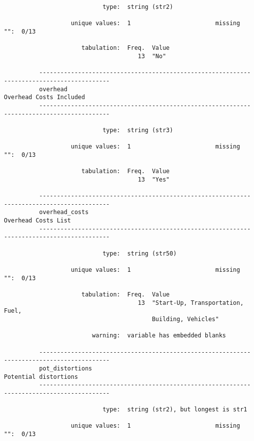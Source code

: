 \documentclass{article}
\begin{document}
\begin{verbatim}
                            type:  string (str2)
          
                   unique values:  1                        missing "":  0/13
          
                      tabulation:  Freq.  Value
                                      13  "No"
          
          ------------------------------------------------------------------------------------------
          overhead                                                           Overhead Costs Included
          ------------------------------------------------------------------------------------------
          
                            type:  string (str3)
          
                   unique values:  1                        missing "":  0/13
          
                      tabulation:  Freq.  Value
                                      13  "Yes"
          
          ------------------------------------------------------------------------------------------
          overhead_costs                                                         Overhead Costs List
          ------------------------------------------------------------------------------------------
          
                            type:  string (str50)
          
                   unique values:  1                        missing "":  0/13
          
                      tabulation:  Freq.  Value
                                      13  "Start-Up, Transportation, Fuel,
                                          Building, Vehicles"
          
                         warning:  variable has embedded blanks
          
          ------------------------------------------------------------------------------------------
          pot_distortions                                                      Potential distortions
          ------------------------------------------------------------------------------------------
          
                            type:  string (str2), but longest is str1
          
                   unique values:  1                        missing "":  0/13
          

\end{verbatim}
\end{document}
